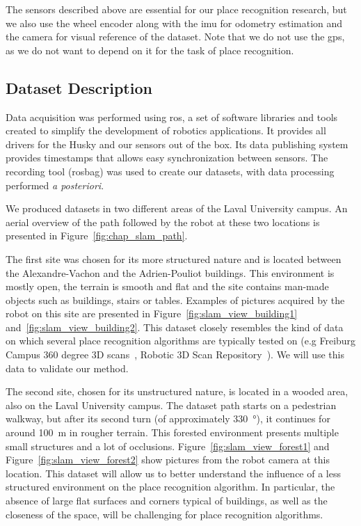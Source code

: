 The sensors described above are essential for our place recognition research, but we also use the wheel encoder along with the \gls*{imu} for odometry estimation and the camera for visual reference of the dataset. Note that we do not use the \gls*{gps}, as we do not want to depend on it for the task of place recognition.


\subsection{Dataset Description}
\label{ssec:chap_slam_platform}

Data acquisition was performed using \gls*{ros}, a set of software libraries and tools created to simplify the development of robotics applications. It provides all drivers for the Husky and our sensors out of the box. Its data publishing system provides timestamps that allows easy synchronization between sensors. The recording tool (rosbag) was used to create our datasets, with data processing performed \textit{a posteriori}.

We produced datasets in two different areas of the Laval University campus. An aerial overview of the path followed by the robot at these two locations is presented in Figure~\ref{fig:chap_slam_path}.

The first site was chosen for its more structured nature and is located between the Alexandre-Vachon and the Adrien-Pouliot buildings. This environment is mostly open, the terrain is smooth and flat and the site contains man-made objects such as buildings, stairs or tables. Examples of pictures acquired by the robot on this site are presented in Figure~\ref{fig:slam_view_building1} and~\ref{fig:slam_view_building2}. This dataset closely resembles the kind of data on which several place recognition algorithms are typically tested on (e.g Freiburg Campus 360 degree 3D scans~\citep{FreiburgDataset}, Robotic 3D Scan Repository~\citep{Datasets}). We will use this data to validate our method.

The second site, chosen for its unstructured nature, is located in a wooded area, also on the Laval University campus. The dataset path starts on a pedestrian walkway, but after its second turn (of approximately \SI{330}{\degree}), it continues for around \SI{100}{\meter} in rougher terrain. This forested environment presents multiple small structures and a lot of occlusions. Figure~\ref{fig:slam_view_forest1} and Figure~\ref{fig:slam_view_forest2} show pictures from the robot camera at this location. This dataset will allow us to better understand the influence of a less structured environment on the place recognition algorithm. In particular, the absence of large flat surfaces and corners typical of buildings, as well as the closeness of the space, will be challenging for place recognition algorithms.

